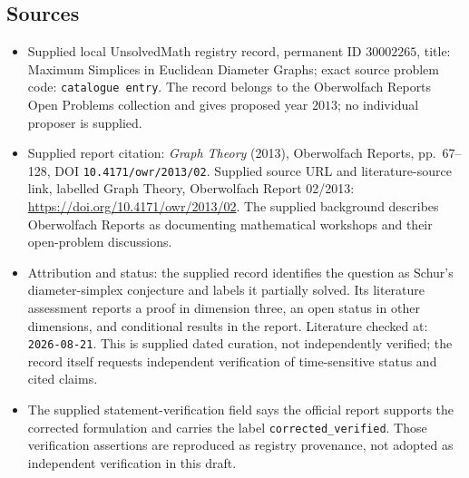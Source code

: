 \documentclass[11pt]{article}
\begin{document}
\subsection{Sources}
\begin{itemize}
\item Supplied local UnsolvedMath registry record, permanent ID \(30002265\), title: Maximum Simplices in Euclidean Diameter Graphs; exact source problem code: \texttt{catalogue entry}. The record belongs to the Oberwolfach Reports Open Problems collection and gives proposed year \(2013\); no individual proposer is supplied.
\item Supplied report citation: \emph{Graph Theory} (2013), Oberwolfach Reports, pp.\ 67--128, DOI \texttt{10.4171/owr/2013/02}. Supplied source URL and literature-source link, labelled Graph Theory, Oberwolfach Report 02/2013: \url{https://doi.org/10.4171/owr/2013/02}. The supplied background describes Oberwolfach Reports as documenting mathematical workshops and their open-problem discussions.
\item Attribution and status: the supplied record identifies the question as Schur's diameter-simplex conjecture and labels it partially solved. Its literature assessment reports a proof in dimension three, an open status in other dimensions, and conditional results in the report. Literature checked at: \texttt{2026-08-21}. This is supplied dated curation, not independently verified; the record itself requests independent verification of time-sensitive status and cited claims.
\item The supplied statement-verification field says the official report supports the corrected formulation and carries the label \texttt{corrected\_verified}. Those verification assertions are reproduced as registry provenance, not adopted as independent verification in this draft.
\end{itemize}
\end{document}
